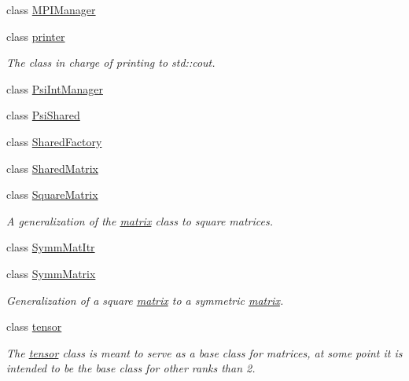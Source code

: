 \begin{DoxyCompactItemize}
class \hyperlink{classJKBuilder_1_1MPIManager}{MPIManager}
\item 
class \hyperlink{classJKBuilder_1_1printer}{printer}
\begin{DoxyCompactList}\small\item\em The class in charge of printing to std::cout. \item\end{DoxyCompactList}\item 
class \hyperlink{classJKBuilder_1_1PsiIntManager}{PsiIntManager}
\item 
class \hyperlink{classJKBuilder_1_1PsiShared}{PsiShared}
\item 
class \hyperlink{classJKBuilder_1_1SharedFactory}{SharedFactory}
\item 
class \hyperlink{classJKBuilder_1_1SharedMatrix}{SharedMatrix}
\item 
class \hyperlink{classJKBuilder_1_1SquareMatrix}{SquareMatrix}
\begin{DoxyCompactList}\small\item\em A generalization of the \hyperlink{classJKBuilder_1_1matrix}{matrix} class to square matrices. \item\end{DoxyCompactList}\item 
class \hyperlink{classJKBuilder_1_1SymmMatItr}{SymmMatItr}
\item 
class \hyperlink{classJKBuilder_1_1SymmMatrix}{SymmMatrix}
\begin{DoxyCompactList}\small\item\em Generalization of a square \hyperlink{classJKBuilder_1_1matrix}{matrix} to a symmetric \hyperlink{classJKBuilder_1_1matrix}{matrix}. \item\end{DoxyCompactList}\item 
class \hyperlink{classJKBuilder_1_1tensor}{tensor}
\begin{DoxyCompactList}\small\item\em The \hyperlink{classJKBuilder_1_1tensor}{tensor} class is meant to serve as a base class for matrices, at some point it is intended to be the base class for other ranks than 2. \item\end{DoxyCompactList}\end{DoxyCompactItemize}
